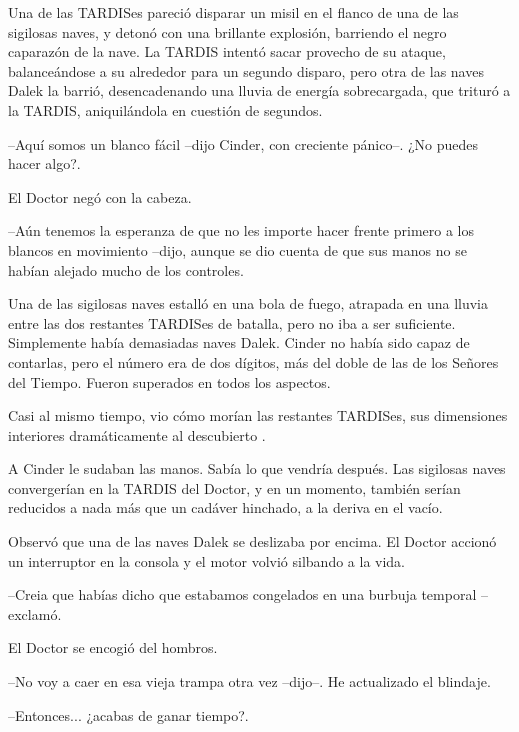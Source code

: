 Una de las TARDISes pareció disparar un misil en el flanco de una de las sigilosas naves, y detonó con una brillante explosión, barriendo el negro caparazón de la nave. La TARDIS intentó sacar provecho de su ataque, balanceándose a su alrededor para un segundo disparo, pero otra de las naves Dalek la barrió, desencadenando una lluvia de energía sobrecargada, que trituró a la TARDIS, aniquilándola en cuestión de segundos.



--Aquí somos un blanco fácil --dijo Cinder, con creciente pánico--. ¿No puedes hacer algo?.



El Doctor negó con la cabeza. 



--Aún tenemos la esperanza de que no les importe hacer frente primero a los blancos en movimiento --dijo, aunque se dio cuenta de que sus manos no se habían alejado mucho de los controles.



Una de las sigilosas naves estalló en una bola de fuego, atrapada en una lluvia entre las dos restantes TARDISes de batalla, pero no iba a ser suficiente. Simplemente había demasiadas naves Dalek. Cinder no había sido capaz de contarlas, pero el número era de dos dígitos, más del doble de las de los Señores del Tiempo. Fueron superados en todos los aspectos.

Casi al mismo tiempo, vio cómo morían las restantes TARDISes, sus dimensiones interiores dramáticamente al descubierto .

A Cinder le sudaban las manos. Sabía lo que vendría después. Las sigilosas naves convergerían en la TARDIS del Doctor, y en un momento, también serían reducidos a nada más que un cadáver hinchado, a la deriva en el vacío.

Observó que una de las naves Dalek se deslizaba por encima. El Doctor accionó un interruptor en la consola y el motor volvió silbando a la vida.



--Creia que habías dicho que estabamos congelados en una burbuja temporal --exclamó.



El Doctor se encogió del hombros. 



--No voy a caer en esa vieja trampa otra vez --dijo--. He actualizado el blindaje.

--Entonces... ¿acabas de ganar tiempo?.

